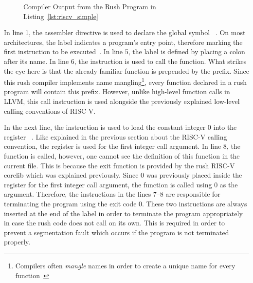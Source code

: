 
\begin{figure}
	\centering
	\caption{Compiler Output from the Rush Program in Listing~\ref{lst:riscv_simple}}\label{lst:riscv_simple_asm}
\end{figure}

In line 1, the  assembler directive is used to declare the global symbol ~\cite[p~.36]{Patterson2017}.
On most architectures, the  label indicates a program's entry point, therefore marking the first instruction to be executed~\cite[p.~19]{Zhirkov2017-wk}.
In line 5, the  label is defined by placing a colon after its name.
In line 6, the  instruction is used to call the  function.
What strikes the eye here is that the already familiar  function is prepended by the  prefix.
Since this rush compiler implements name mangling\footnote{Compilers often \emph{mangle} names in order to create a unique name for every function~\cite[pp.~119-120]{Levine2000}},
every function declared in a rush program will contain this prefix.
However, unlike high-level function calls in LLVM, this call instruction is used alongside the previously explained low-level calling conventions of RISC-V.

In the next line, the  instruction is used to load the constant integer 0 into the register ~\cite[reference]{Patterson2017}.
Like explained in the previous section about the RISC-V calling convention,
the register  is used for the first integer call argument.
In line 8, the  function is called, however, one cannot see the definition of this function in the current file.
This is because the exit function is provided by the rush RISC-V corelib which was explained previously.
Since 0 was previously placed inside the register for the first integer call argument, the  function is called using 0 as the argument.
Therefore, the instructions in the lines 7--8 are responsible for terminating the program using the exit code 0.
These two instructions are always inserted at the end of the  label in order to terminate the program appropriately in case the rush code does not call  on its own.
This is required in order to prevent a segmentation fault which occurs if the program is not terminated properly.

